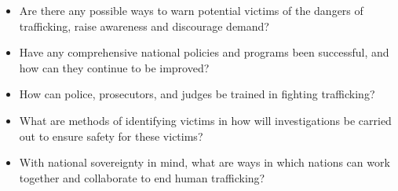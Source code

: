 \documentclass[10pt, letterpaper]{article}
\begin{document}
\begin{itemize}
\item
  
  Are there any possible ways to warn potential victims of the dangers
  of trafficking, raise awareness and discourage demand?
  
\item
  
  Have any comprehensive national policies and programs been successful,
  and how can they continue to be improved?
  
\item
  
  How can police, prosecutors, and judges be trained in fighting
  trafficking?
  
\item
  
  What are methods of identifying victims in how will investigations be
  carried out to ensure safety for these victims?
  
\item
  
  With national sovereignty in mind, what are ways in which nations can
  work together and collaborate to end human trafficking?
  
\end{itemize}
\end{document}
